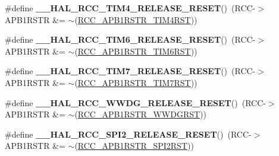 \begin{DoxyCompactItemize}
\item 
\hypertarget{group___r_c_c___a_p_b1___force___release___reset_gaab43d37f4682740d15c4b1fadb908d51}{\#define {\bfseries \-\_\-\-\_\-\-H\-A\-L\-\_\-\-R\-C\-C\-\_\-\-T\-I\-M4\-\_\-\-R\-E\-L\-E\-A\-S\-E\-\_\-\-R\-E\-S\-E\-T}()~(R\-C\-C-\/$>$A\-P\-B1\-R\-S\-T\-R \&= $\sim$(\hyperlink{group___peripheral___registers___bits___definition_ga6a720364de988965b6d2f91ed6519570}{R\-C\-C\-\_\-\-A\-P\-B1\-R\-S\-T\-R\-\_\-\-T\-I\-M4\-R\-S\-T}))}\label{group___r_c_c___a_p_b1___force___release___reset_gaab43d37f4682740d15c4b1fadb908d51}

\item 
\hypertarget{group___r_c_c___a_p_b1___force___release___reset_ga7eba1763b83169bc7cec3e10bfbccf20}{\#define {\bfseries \-\_\-\-\_\-\-H\-A\-L\-\_\-\-R\-C\-C\-\_\-\-T\-I\-M6\-\_\-\-R\-E\-L\-E\-A\-S\-E\-\_\-\-R\-E\-S\-E\-T}()~(R\-C\-C-\/$>$A\-P\-B1\-R\-S\-T\-R \&= $\sim$(\hyperlink{group___peripheral___registers___bits___definition_ga8d64bd82cf47a209afebc7d663e28383}{R\-C\-C\-\_\-\-A\-P\-B1\-R\-S\-T\-R\-\_\-\-T\-I\-M6\-R\-S\-T}))}\label{group___r_c_c___a_p_b1___force___release___reset_ga7eba1763b83169bc7cec3e10bfbccf20}

\item 
\hypertarget{group___r_c_c___a_p_b1___force___release___reset_ga4451d9cbc82223d913fae1f6b8187996}{\#define {\bfseries \-\_\-\-\_\-\-H\-A\-L\-\_\-\-R\-C\-C\-\_\-\-T\-I\-M7\-\_\-\-R\-E\-L\-E\-A\-S\-E\-\_\-\-R\-E\-S\-E\-T}()~(R\-C\-C-\/$>$A\-P\-B1\-R\-S\-T\-R \&= $\sim$(\hyperlink{group___peripheral___registers___bits___definition_ga40b1d355ee76ad9a044ad37f1629e760}{R\-C\-C\-\_\-\-A\-P\-B1\-R\-S\-T\-R\-\_\-\-T\-I\-M7\-R\-S\-T}))}\label{group___r_c_c___a_p_b1___force___release___reset_ga4451d9cbc82223d913fae1f6b8187996}

\item 
\hypertarget{group___r_c_c___a_p_b1___force___release___reset_ga63fa37b173c2c1d9249389148f96e5f1}{\#define {\bfseries \-\_\-\-\_\-\-H\-A\-L\-\_\-\-R\-C\-C\-\_\-\-W\-W\-D\-G\-\_\-\-R\-E\-L\-E\-A\-S\-E\-\_\-\-R\-E\-S\-E\-T}()~(R\-C\-C-\/$>$A\-P\-B1\-R\-S\-T\-R \&= $\sim$(\hyperlink{group___peripheral___registers___bits___definition_ga0d2591ac0655a8798f4c16cef97e6f94}{R\-C\-C\-\_\-\-A\-P\-B1\-R\-S\-T\-R\-\_\-\-W\-W\-D\-G\-R\-S\-T}))}\label{group___r_c_c___a_p_b1___force___release___reset_ga63fa37b173c2c1d9249389148f96e5f1}

\item 
\hypertarget{group___r_c_c___a_p_b1___force___release___reset_gacb910fd0c3c5a27d020ef3df20fce4c7}{\#define {\bfseries \-\_\-\-\_\-\-H\-A\-L\-\_\-\-R\-C\-C\-\_\-\-S\-P\-I2\-\_\-\-R\-E\-L\-E\-A\-S\-E\-\_\-\-R\-E\-S\-E\-T}()~(R\-C\-C-\/$>$A\-P\-B1\-R\-S\-T\-R \&= $\sim$(\hyperlink{group___peripheral___registers___bits___definition_ga0a6289a35547cf0d5300706f9baa18ea}{R\-C\-C\-\_\-\-A\-P\-B1\-R\-S\-T\-R\-\_\-\-S\-P\-I2\-R\-S\-T}))}\label{group___r_c_c___a_p_b1___force___release___reset_gacb910fd0c3c5a27d020ef3df20fce4c7}


\end{DoxyCompactItemize}
